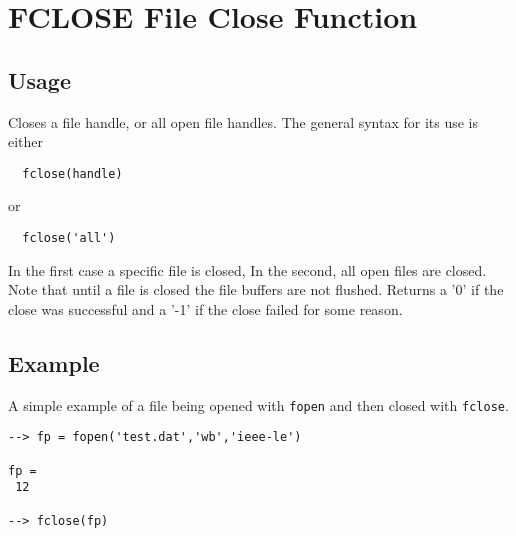 \section{FCLOSE File Close Function}

\subsection{Usage}

Closes a file handle, or all open file handles.  The general syntax
for its use is either
\begin{verbatim}
  fclose(handle)
\end{verbatim}
or
\begin{verbatim}
  fclose('all')
\end{verbatim}
In the first case a specific file is closed,  In the second, all open
files are closed.  Note that until a file is closed the file buffers
are not flushed.  Returns a '0' if the close was successful and a '-1' if
the close failed for some reason.
\subsection{Example}

A simple example of a file being opened with \verb|fopen| and then closed with \verb|fclose|.
\begin{verbatim}
--> fp = fopen('test.dat','wb','ieee-le')

fp = 
 12 

--> fclose(fp)
\end{verbatim}
